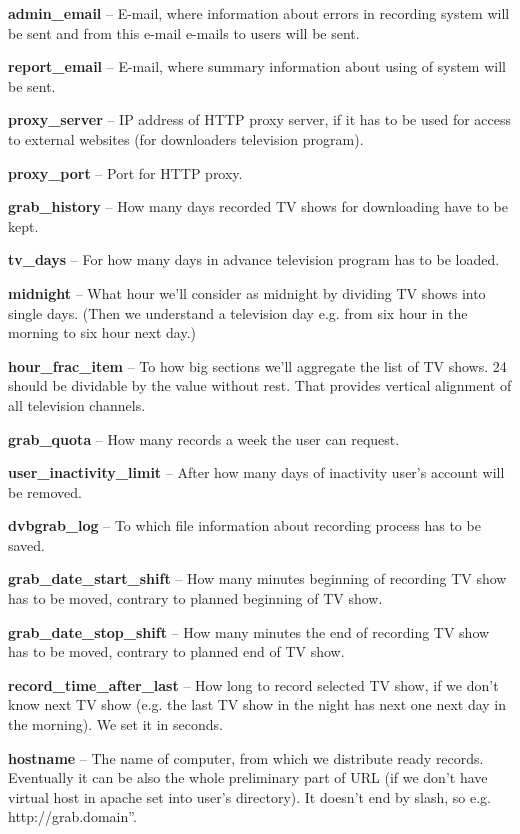 \item\textbf{admin\_email} -- E-mail, where information about errors in recording system will be sent and from this e-mail e-mails to users will be sent.
\item\textbf{report\_email} -- E-mail, where summary information about using of system will be sent.
\item\textbf{proxy\_server} -- IP address of HTTP proxy server, if it has to be used for access to external websites (for downloaders television program).
\item\textbf{proxy\_port} -- Port for HTTP proxy.
\item\textbf{grab\_history} -- How many days recorded TV shows for downloading have to be kept.
\item\textbf{tv\_days} -- For how many days in advance television program has to be loaded.
\item\textbf{midnight} -- What hour we'll consider as midnight by dividing TV shows into single days. (Then we understand a television day e.g. from six hour in the morning to six hour next day.)
\item\textbf{hour\_frac\_item} -- To how big sections we'll aggregate the list of TV shows. 24 should be dividable by the value without rest. That provides vertical alignment of all television channels.
\item\textbf{grab\_quota} -- How many records a week the user can request.
\item\textbf{user\_inactivity\_limit} -- After how many days of inactivity user's account will be removed.
\item\textbf{dvbgrab\_log} -- To which file information about recording process has to be saved.
\item\textbf{grab\_date\_start\_shift} -- How many minutes beginning of recording TV show has to be moved, contrary to planned beginning of TV show.
\item\textbf{grab\_date\_stop\_shift} -- How many minutes the end of recording TV show has to be moved, contrary to planned end of TV show.
\item\textbf{record\_time\_after\_last} -- How long to record selected TV show, if we don't know next TV show (e.g. the last TV show in the night has next one next day in the morning). We set it in seconds.
\item\textbf{hostname} -- The name of computer, from which we distribute ready records. Eventually it can be also the whole preliminary part of URL (if we don't have virtual host in apache set into user's directory). It doesn't end by slash, so e.g. \quotedblbase http://grab.domain''.
